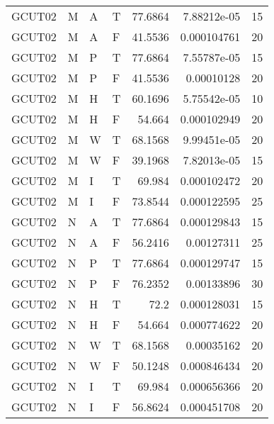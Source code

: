 \begin{tabular}{llllrrr}
    GCUT02   & M     & A     & T          & 77.6864    & 7.88212e-05 & 15       \\
    GCUT02   & M     & A     & F          & 41.5536    & 0.000104761 & 20       \\
    GCUT02   & M     & P     & T          & 77.6864    & 7.55787e-05 & 15       \\
    GCUT02   & M     & P     & F          & 41.5536    & 0.00010128  & 20       \\
    GCUT02   & M     & H     & T          & 60.1696    & 5.75542e-05 & 10       \\
    GCUT02   & M     & H     & F          & 54.664     & 0.000102949 & 20       \\
    GCUT02   & M     & W     & T          & 68.1568    & 9.99451e-05 & 20       \\
    GCUT02   & M     & W     & F          & 39.1968    & 7.82013e-05 & 15       \\
    GCUT02   & M     & I     & T          & 69.984     & 0.000102472 & 20       \\
    GCUT02   & M     & I     & F          & 73.8544    & 0.000122595 & 25       \\
    GCUT02   & N     & A     & T          & 77.6864    & 0.000129843 & 15       \\
    GCUT02   & N     & A     & F          & 56.2416    & 0.00127311  & 25       \\
    GCUT02   & N     & P     & T          & 77.6864    & 0.000129747 & 15       \\
    GCUT02   & N     & P     & F          & 76.2352    & 0.00133896  & 30       \\
    GCUT02   & N     & H     & T          & 72.2       & 0.000128031 & 15       \\
    GCUT02   & N     & H     & F          & 54.664     & 0.000774622 & 20       \\
    GCUT02   & N     & W     & T          & 68.1568    & 0.00035162  & 20       \\
    GCUT02   & N     & W     & F          & 50.1248    & 0.000846434 & 20       \\
    GCUT02   & N     & I     & T          & 69.984     & 0.000656366 & 20       \\
    GCUT02   & N     & I     & F          & 56.8624    & 0.000451708 & 20       \\
    \hline
\end{tabular}